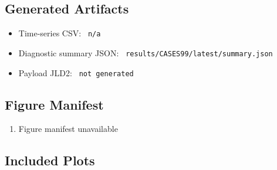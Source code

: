 \subsection{Generated Artifacts}
\begin{itemize}
  \item Time-series CSV: \texttt{ n/a }
  \item Diagnostic summary JSON: \texttt{ results/CASES99/latest/summary.json }
  \item Payload JLD2: \texttt{ not generated }
\end{itemize}

\subsection{Figure Manifest}
\begin{enumerate}
  \item Figure manifest unavailable
\end{enumerate}

\subsection{Included Plots}

